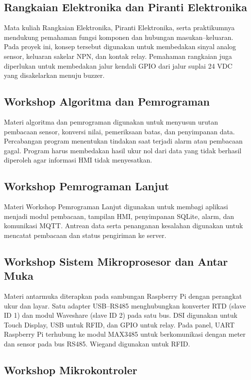 \subsection{Rangkaian Elektronika dan Piranti Elektronika}

Mata kuliah Rangkaian Elektronika, Piranti Elektronika, serta praktikumnya mendukung pemahaman fungsi komponen dan hubungan masukan--keluaran. Pada proyek ini, konsep tersebut digunakan untuk membedakan sinyal analog sensor, keluaran sakelar NPN, dan kontak relay. Pemahaman rangkaian juga diperlukan untuk membedakan jalur kendali GPIO dari jalur suplai 24 VDC yang disakelarkan menuju buzzer.

\subsection{Workshop Algoritma dan Pemrograman}

Materi algoritma dan pemrograman digunakan untuk menyusun urutan pembacaan sensor, konversi nilai, pemeriksaan batas, dan penyimpanan data. Percabangan program menentukan tindakan saat terjadi alarm atau pembacaan gagal. Program harus membedakan hasil ukur nol dari data yang tidak berhasil diperoleh agar informasi HMI tidak menyesatkan.

\subsection{Workshop Pemrograman Lanjut}

Materi Workshop Pemrograman Lanjut digunakan untuk membagi aplikasi menjadi modul pembacaan, tampilan HMI, penyimpanan SQLite, alarm, dan komunikasi MQTT. Antrean data serta penanganan kesalahan digunakan untuk mencatat pembacaan dan status pengiriman ke server.

\subsection{Workshop Sistem Mikroprosesor dan Antar Muka}

Materi antarmuka diterapkan pada sambungan Raspberry Pi dengan perangkat ukur dan layar. Satu adapter USB--RS485 menghubungkan konverter RTD (slave ID 1) dan modul Waveshare (slave ID 2) pada satu bus. DSI digunakan untuk Touch Display, USB untuk RFID, dan GPIO untuk relay. Pada panel, UART Raspberry Pi terhubung ke modul MAX3485 untuk berkomunikasi dengan meter dan sensor pada bus RS485. Wiegand digunakan untuk RFID.

\subsection{Workshop Mikrokontroler}

